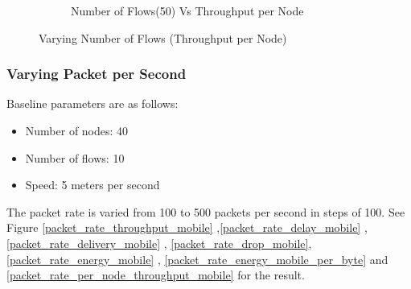 \begin{figure}[h]
\begin{subfigure}{.5\textwidth}
         \caption{Number of Flows(50) Vs Throughput per Node}
        \end{subfigure}
\caption{Varying Number of Flows (Throughput per Node)}
\label{flow_per_node_throughput_mobile}
\end{figure}

\subsubsection{Varying Packet per Second}
Baseline parameters are as follows:
\begin{itemize}
    \item Number of nodes: 40
    \item Number of flows: 10
    \item Speed: 5 meters per second
\end{itemize}
The packet rate is varied from 100 to 500 packets per second in steps of 100.
See Figure \ref{packet_rate_throughput_mobile} ,\ref{packet_rate_delay_mobile} , \ref{packet_rate_delivery_mobile} , \ref{packet_rate_drop_mobile}, \ref{packet_rate_energy_mobile} , \ref{packet_rate_energy_mobile_per_byte} and \ref{packet_rate_per_node_throughput_mobile} for the result.
